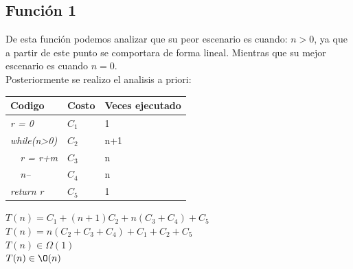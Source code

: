\documentclass[spanish]{article}
\begin{document}
				\subsection*{Función 1}
					De esta función podemos analizar que su peor escenario es cuando: $n>0$, ya que a partir de este punto se comportara de forma lineal. Mientras que su mejor escenario es cuando $n=0$.\\
					Posteriormente se realizo el analisis a priori:\\
					\begin{center}
						\begin{table}[H]
							\begin{tabular}{|l|l|l|}
								\hline
								\rowcolor[HTML]{FFCC67} 
								Codigo                           & Costo & Veces ejecutado \\ \hline
								\textit{r = 0}                    & $C_1$    & 1               \\ \hline
								\textit{while(n\textgreater{}0)} & $C_2$    & n+1             \\ \hline
								\textit{\  \  r = r+m}                 & $C_3$    & n               \\ \hline
								\textit{\  \  n--}                     & $C_4$    & n               \\ \hline
								\textit{return r}                & $C_5$    & 1               \\ \hline
							\end{tabular}
						\end{table}						
							$T(n) = C_1+(n+1)C_2+n(C_3+C_4)+C_5$\\							
							$T(n) = n(C_2+C_3+C_4)+C_1+C_2+C_5$\\							
							$T(n) \in \Omega(1)$\\							
							$T(n) \in \O(n)$\\
					\end{center}
\end{document}
